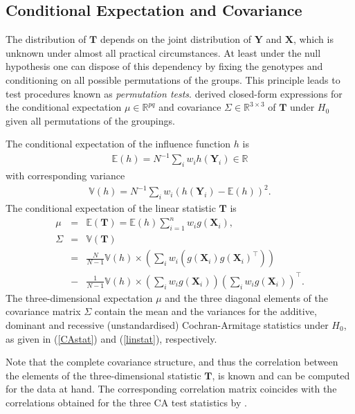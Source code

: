 \documentclass[bimj,fleqn]{w-art}
\newcommand{\R}{\mathbb{R} }
\newcommand{\V}{\mathbb{V}} %
\newcommand{\E}{\mathbb{E}} %
\newcommand{\X}{\mathbf{X}}
\newcommand{\Y}{\mathbf{Y}}
\newcommand{\T}{\mathbf{T}}
\begin{document}
\subsection{Conditional Expectation and Covariance}

The distribution of $\T$  depends on the joint
distribution of $\Y$ and $\X$, which is unknown under almost all practical
circumstances. At least under the null hypothesis one can dispose of this
dependency by fixing the genotypes and conditioning on all possible
permutations of the groups. 
This principle leads to test procedures known as \textit{permutation tests}. 
\citet{StrasserWeber1999} derived closed-form expressions for the conditional 
expectation $\mu \in \R^{pq}$ and covariance $\Sigma \in \R^{3 \times 3}$ 
of $\T$ under $H_0$ given all permutations of the groupings.

The conditional expectation of the influence function $h$ is
\begin{eqnarray*}
\E(h) = N^{-1} \sum_i w_i h(\Y_i) \in \R
\end{eqnarray*}
with corresponding variance
\begin{eqnarray*}
\V(h) = N^{-1} \sum_i w_i \left(h(\Y_i) - \E(h)\right)^2.
\end{eqnarray*}
The conditional expectation of the linear statistic $\T$ is 
\begin{eqnarray}
\mu & = & \E(\T) = \E(h) \sum_{i = 1}^n w_i g(\X_i), \nonumber \\
\Sigma & = & \V(\T) \nonumber \\
& = &
    \frac{N}{N - 1}  \V(h) \times
        \left(\sum_i w_i \left( g(\X_i) g(\X_i)^\top\right) \right)
\label{expectcovar}
\\
& - & \frac{1}{N - 1}  \V(h)  \times \left(
        \sum_i  w_i g(\X_i) \right) \left( \sum_i w_i g(\X_i)\right)^\top.
\nonumber
\end{eqnarray}
The three-dimensional expectation $\mu$ and the three diagonal elements
of the covariance matrix $\Sigma$ contain the mean and the variances
for the additive, dominant and recessive (unstandardised) 
Cochran-Armitage statistics under $H_0$, as given in (\ref{CAstat}) 
and (\ref{linstat}), respectively.

Note that the complete covariance structure, and thus the 
correlation between the elements of the three-dimensional statistic 
$\T$, is known and can be computed for the data at hand.
The corresponding correlation matrix coincides with the correlations
obtained for the three CA test statistics by \citet{Freidlin:2002}.
\end{document}
